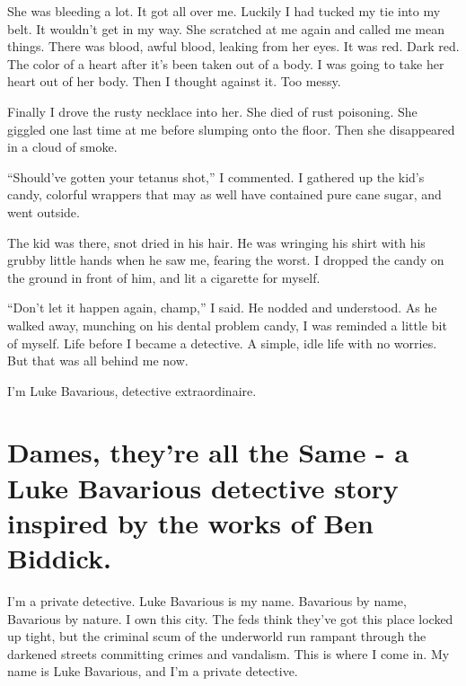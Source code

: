 She was bleeding a lot. It got all over me. Luckily I had tucked my
tie into my belt. It wouldn't get in my way. She scratched at
me again and called me mean things. There was blood, awful blood,
leaking from her eyes. It was red. Dark red. The color of a heart
after it's been taken out of a body. I was going to take her
heart out of her body. Then I thought against it. Too messy.



Finally I drove the rusty necklace into her. She died of rust
poisoning. She giggled one last time at me before slumping onto the
floor. Then she disappeared in a cloud of smoke.

``Should've gotten your tetanus shot,'' I
commented. I gathered up the kid's candy, colorful wrappers
that may as well have contained pure cane sugar, and went
outside.



The kid was there, snot dried in his hair. He was wringing his
shirt with his grubby little hands when he saw me, fearing the
worst. I dropped the candy on the ground in front of him, and lit a
cigarette for myself.

``Don't let it happen again, champ,'' I said. He
nodded and understood. As he walked away, munching on his dental
problem candy, I was reminded a little bit of myself. Life before I
became a detective. A simple, idle life with no worries. But that
was all behind me now.



I'm Luke Bavarious, detective extraordinaire. 

 



\chapter[Dames, they're all the Same]{Dames, they're all the Same - a
Luke Bavarious detective story inspired by the works of Ben Biddick.}





I'm a private detective. Luke Bavarious is my name. Bavarious by
name, Bavarious by nature. I own this city. The feds think they've
got this place locked up tight, but the criminal scum of the
underworld run rampant through the darkened streets committing
crimes and vandalism. This is where I come in. My name is Luke
Bavarious, and I'm a private detective.



